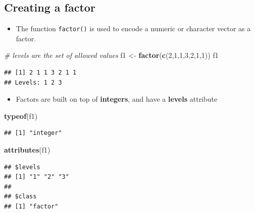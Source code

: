 \documentclass[]{book}
\newenvironment{Shaded}{\begin{snugshade}}{\end{snugshade}}
\newcommand{\CommentTok}[1]{\textcolor[rgb]{0.56,0.35,0.01}{\textit{#1}}}
\newcommand{\DecValTok}[1]{\textcolor[rgb]{0.00,0.00,0.81}{#1}}
\newcommand{\KeywordTok}[1]{\textcolor[rgb]{0.13,0.29,0.53}{\textbf{#1}}}
\newcommand{\NormalTok}[1]{#1}
\newcommand{\StringTok}[1]{\textcolor[rgb]{0.31,0.60,0.02}{#1}}
\providecommand{\tightlist}{%
  \setlength{\itemsep}{0pt}\setlength{\parskip}{0pt}}
\begin{document}
\hypertarget{creating-a-factor}{%
\subsection{Creating a factor}\label{creating-a-factor}}

\begin{itemize}
\tightlist
\item
  The function \texttt{factor()} is used to encode a numeric or character vector as a factor.
\end{itemize}

\begin{Shaded}
\begin{Highlighting}[]
\CommentTok{# levels are the set of allowed values}
\NormalTok{f1 <-}\StringTok{ }\KeywordTok{factor}\NormalTok{(}\KeywordTok{c}\NormalTok{(}\DecValTok{2}\NormalTok{,}\DecValTok{1}\NormalTok{,}\DecValTok{1}\NormalTok{,}\DecValTok{3}\NormalTok{,}\DecValTok{2}\NormalTok{,}\DecValTok{1}\NormalTok{,}\DecValTok{1}\NormalTok{))}
\NormalTok{f1}
\end{Highlighting}
\end{Shaded}

\begin{verbatim}
## [1] 2 1 1 3 2 1 1
## Levels: 1 2 3
\end{verbatim}

\begin{itemize}
\tightlist
\item
  Factors are built on top of \textbf{integers}, and have a \textbf{levels} attribute
\end{itemize}

\begin{Shaded}
\begin{Highlighting}[]
\KeywordTok{typeof}\NormalTok{(f1)}
\end{Highlighting}
\end{Shaded}

\begin{verbatim}
## [1] "integer"
\end{verbatim}

\begin{Shaded}
\begin{Highlighting}[]
\KeywordTok{attributes}\NormalTok{(f1)}
\end{Highlighting}
\end{Shaded}

\begin{verbatim}
## $levels
## [1] "1" "2" "3"
## 
## $class
## [1] "factor"
\end{verbatim}
\end{document}

